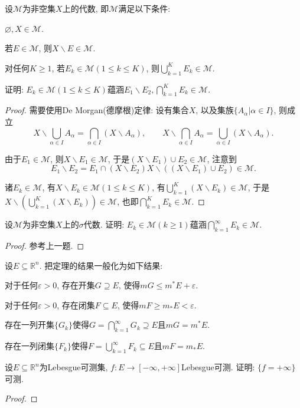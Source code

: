 \begin{quiza}
\woe 设\(\mathscr{M}\)为非空集\(X\)上的代数, 即\(\mathscr{M}\)满足以下条件:\begin{compactenum}[(i)]
    \item \(\varnothing,X\in\mathscr{M}\).
    \item 若\(E\in\mathscr{M}\), 则\(X\backslash E\in\mathscr{M}\).
    \item 对任何\(K\geqslant 1\), 若\(E_k\in \mathscr{M}(1\leqslant k\leqslant K)\), 则\(\bigcup_{k=1}^{K}E_k\in\mathscr{M}\).
    \end{compactenum}
证明: \(E_k\in\mathscr{M}(1\leqslant k\leqslant K)\)蕴涵\(E_1\backslash E_2,\bigcap_{k=1}^{K}E_k\in\mathscr{M}\).
\begin{proof}
需要使用De Morgan(德摩根)定律: 设有集合\(X\), 以及集族\(\{A_{\alpha}|\alpha\in I\}\), 则成立\[X\backslash\bigcup_{\alpha\in I}A_{\alpha}=\bigcap_{\alpha\in I}\left(X\backslash A_{\alpha}\right),\qquad X\backslash\bigcap_{\alpha\in I}A_{\alpha}=\bigcup_{\alpha\in I}\left(X\backslash A_{\alpha}\right).\]

由于\(E_1\in\mathscr{M}\), 则\(X\backslash E_1\in\mathscr{M}\), 于是\(\left(X\backslash E_1\right)\cup E_2\in\mathscr{M}\), 注意到\[E_1\backslash E_2=E_1\cap\left(X\backslash E_2\right) X\backslash\left(\left(X\backslash E_1\right)\cup E_2\right)\in\mathscr{M}.\]

诸\(E_k\in\mathscr{M}\), 有\(X\backslash E_k\in \mathscr{M}(1\leqslant k\leqslant K)\), 有\(\bigcup_{k=1}^K\left(X\backslash E_k\right)\in \mathscr{M}\), 于是\(X\backslash\left(\bigcup_{k=1}^K\left(X\backslash E_k\right)\right)\in\mathscr{M}\), 也即\(\bigcap_{k=1}^{K}E_k\in\mathscr{M}\).
\end{proof}
\woe 设\(\mathscr{M}\)为非空集\(X\)上的\(\sigma\)代数. 证明: \(E_k\in\mathscr{M}(k\geqslant 1)\)蕴涵\(\bigcap_{k=1}^{\infty}E_k\in\mathscr{M}.\)
\begin{proof}
	参考上一题.
\end{proof}
\woe 设\(E\subseteq\mathbb{R}^n\). 把定理的结果一般化为如下结果:
\begin{quizs}
\item 对于任何\(\varepsilon>0\), 存在开集\(G\supseteq E\), 使得\(mG\leqslant m^*E+\varepsilon.\)
\item 对于任何\(\varepsilon>0\), 存在闭集\(F\subseteq E\), 使得\(mF\geqslant m_*E<\varepsilon\).
\item 存在一列开集\(\{G_k\}\)使得\(G=\bigcap_{k=1}^{\infty}G_k\supseteq E\)且\(mG=m^*E\).
\item 存在一列闭集\(\{F_k\}\)使得\(F=\bigcup_{k=1}^{\infty}F_k\subseteq E\)且\(mF=m_*E\).
\end{quizs}
\woe 设\(E\subseteq\mathbb{R}^n\)为Lebesgue可测集, \(f:E\rightarrow [-\infty,+\infty]\)Lebesgue可测. 证明: \(\{f=+\infty\}\)可测.
\begin{proof}
	

\end{proof}
\end{quiza}
